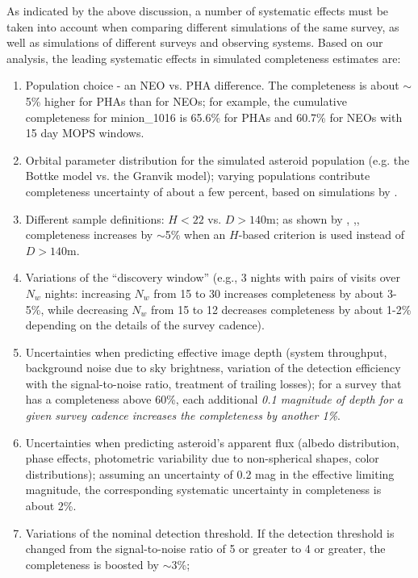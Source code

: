As indicated by the above discussion, a number of systematic effects must be taken into account when
comparing different simulations of the same survey, as well as simulations of different surveys and observing
systems. Based on our analysis, the leading systematic effects in simulated completeness estimates are:
\begin{enumerate}
\item Population choice - an NEO vs. PHA difference. The completeness is about $\sim$5\% higher for PHAs than for NEOs; for example,
the cumulative completeness for minion\_1016 is 65.6\% for PHAs and 60.7\% for NEOs with 15 day MOPS windows.
\item Orbital parameter distribution for the simulated asteroid population (e.g. the Bottke model
             vs. the Granvik model); varying populations contribute completeness uncertainty of about a few percent, based
             on simulations by \citet{VeresChesley2017neo}. 
\item Different sample definitions: $H<22$ vs. $D>140$m; as shown by  \citet{2016AJ....152...79W}, \citealt{GMS2016},,
          completeness increases by $\sim$5\% when an $H$-based criterion is used instead of $D>140$m.
\item Variations of the ``discovery window'' (e.g., 3 nights with pairs of visits over $N_w$ nights: increasing
        $N_w$ from 15 to 30 increases completeness by about 3-5\%, while decreasing $N_w$ from 15 to 12 decreases 
        completeness by about 1-2\% depending on the details of the survey cadence).
\item Uncertainties when predicting effective image depth (system throughput, background noise due to sky brightness, 
          variation of the detection efficiency with the signal-to-noise ratio, treatment of trailing losses); for a survey that has a 
          completeness above 60\%, each additional {\it 0.1 magnitude of depth for a given survey cadence increases the 
          completeness by another 1\%}.
\item Uncertainties when predicting asteroid's apparent flux (albedo distribution, phase effects, photometric variability
          due to non-spherical shapes, color distributions); assuming an uncertainty of 0.2 mag in the effective
          limiting magnitude, the corresponding  systematic uncertainty in completeness is about 2\%.
\item Variations of the nominal detection threshold. If the detection threshold is changed from the
          signal-to-noise ratio of 5 or greater to 4 or greater, the completeness is boosted by $\sim$3\%;

\end{enumerate}
